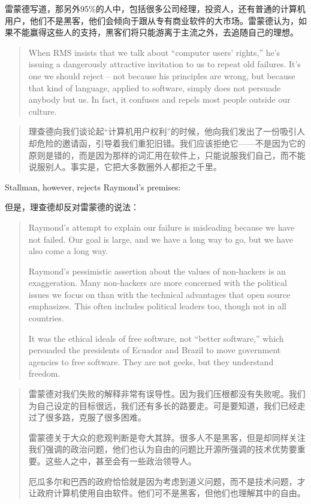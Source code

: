 \ifdefined\chs
雷蒙德写道，那另外95\%的人中，包括很多公司经理，投资人，还有普通的计算机用户，他们不是黑客，他们会倾向于跟从专有商业软件的大市场。雷蒙德认为，如果不能赢得这些人的支持，黑客们将只能游离于主流之外，去追随自己的理想。
\fi

\ifdefined\eng
\begin{quote}
When RMS insists that we talk about ``computer users' rights,'' he's issuing a dangerously attractive invitation to us to repeat old failures. It's one we should reject -- not because his principles are wrong, but because that kind of language, applied to software, simply does not persuade anybody but us. In fact, it confuses and repels most people outside our culture.
\end{quote}
\fi

\ifdefined\chs
\begin{quote}
理查德向我们谈论起``计算机用户权利''的时候，他向我们发出了一份吸引人却危险的邀请函，引导着我们重犯旧错。我们应该拒绝它——不是因为它的原则是错的，而是因为那样的词汇用在软件上，只能说服我们自己，而不能说服别人。事实是，它把大多数圈外人都拒之千里。
\end{quote}
\fi

\ifdefined\eng
Stallman, however, rejects Raymond's premises:
\fi

\ifdefined\chs
但是，理查德却反对雷蒙德的说法：
\fi

\ifdefined\eng
\begin{quote}
Raymond's attempt to explain our failure is misleading because we have not failed.  Our goal is large, and we have a long way to go, but we have also come a long way.

Raymond's pessimistic assertion about the values of non-hackers is an exaggeration.  Many non-hackers are more concerned with the political issues we focus on than with the technical advantages that open source emphasizes.  This often includes political leaders too, though not in all countries.

It was the ethical ideals of free software, not ``better software,'' which persuaded the presidents of Ecuador and Brazil to move government agencies to free software.  They are not geeks, but they understand freedom.
\end{quote}
\fi

\ifdefined\chs
\begin{quote}
雷蒙德对我们失败的解释非常有误导性。因为我们压根都没有失败呢。我们为自己设定的目标很远，我们还有多长的路要走。可是要知道，我们已经走过了很多路，克服了很多困难。

雷蒙德关于大众的悲观判断是夸大其辞。很多人不是黑客，但是却同样关注我们强调的政治问题，他们也认为自由的问题比开源所强调的技术优势要重要。这些人之中，甚至会有一些政治领导人。

厄瓜多尔和巴西的政府恰恰就是因为考虑到道义问题，而不是技术问题，才让政府计算机使用自由软件。他们可不是黑客，但他们也理解其中的自由。

\end{quote}
\fi

